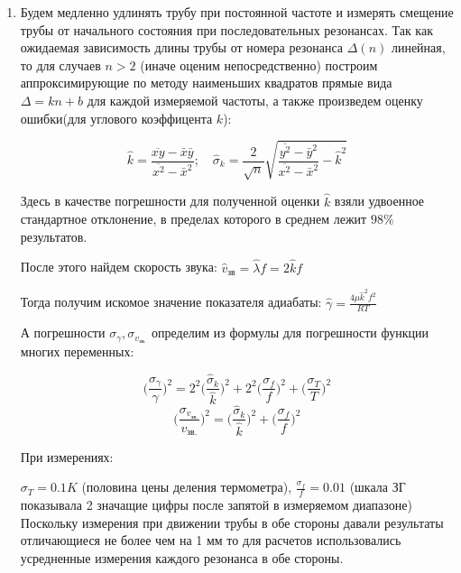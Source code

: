 \documentclass[10pt]{article}
\begin{document}
    \begin{enumerate}
    \item 
         Будем медленно удлинять трубу при постоянной частоте и измерять смещение трубы от начального состояния при последовательных резонансах.
    Так как ожидаемая зависимость длины трубы от номера резонанса $\Delta(n)$ линейная, то для случаев $n > 2$ (иначе оценим непосредственно) построим аппроксимирующие по методу наименьших квадратов прямые вида $\Delta = kn + b$ для каждой измеряемой частоты, а также произведем оценку ошибки(для углового коэффицента $k$):

    \begin{equation}
        \hat{k} = \frac{\overline{xy} - \bar{x}\bar{y}}{\overline{x^2} - \bar{x}^2} ;\quad \hat{\sigma}_k = \frac{2}{\sqrt{n}}\sqrt{\frac{\overline{y^2} - \bar{y}^2}{\overline{x^2} - \bar{x}^2} - \hat{k}^2}
    \end{equation}

    Здесь в качестве погрешности для полученной оценки $\hat{k}$  взяли удвоенное стандартное отклонение, в пределах которого в среднем лежит $98\%$ результатов.

    После этого найдем скорость звука: $\hat{v}_\text{зв} = \hat{\lambda} f = 2 \hat{k} f$

    Тогда получим искомое значение показателя адиабаты: $\hat{\gamma} = \frac{4\mu \hat{k}^2 f^2}{RT}$ 

    А погрешности $\sigma_\gamma, \sigma_{v_\text{зв.}}$ определим из формулы для погрешности функции многих переменных:

    \begin{equation}
        \bigg(\frac{\sigma_\gamma}{\gamma}\bigg) ^ 2 =    2^2 \bigg(\frac{\hat{\sigma}_k}{\hat{k}}\bigg) ^ 2 + 2^2 \bigg(\frac{\sigma_f}{f}\bigg) ^ 2 + \bigg(\frac{\sigma_T}{T}\bigg) ^ 2 
    \end{equation}
    \begin{equation}
        \bigg(\frac{\sigma_{v_\text{зв.}}}{v_\text{зв.}}\bigg) ^ 2 =    \bigg(\frac{\hat{\sigma}_k}{\hat{k}}\bigg) ^ 2 + \bigg(\frac{\sigma_f}{f}\bigg) ^ 2
    \end{equation}


    При измерениях:

        $\sigma_T = 0.1 K$ (половина цены деления термометра), $ \frac{\sigma_f}{f} = 0.01 $ (шкала ЗГ показывала 2 значащие цифры после запятой в измеряемом диапазоне)
        Поскольку измерения при движении трубы в обе стороны давали результаты отличающиеся не более чем на 1 мм то для расчетов использовались усредненные измерения каждого резонанса в обе стороны. 
  

\end{enumerate}
\end{document}
